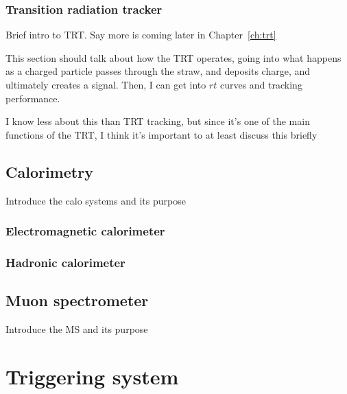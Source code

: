 \subsubsection{Transition radiation tracker} 

{\color{red} Brief intro to TRT. Say more is coming later in
  Chapter~\ref{ch:trt}}

{\color{red}This section should talk about how the TRT operates, going into
  what happens as a charged particle passes through the straw, and deposits
  charge, and ultimately creates a signal. Then, I can get into $rt$ curves
  and tracking performance.}

{\color{red}I know less about this than TRT tracking, but since it's one of the
  main functions of the TRT, I think it's important to at least discuss this
    briefly}

\subsection{Calorimetry} 

{\color{red} Introduce the calo systems and its purpose}

\subsubsection{Electromagnetic calorimeter} 

\subsubsection{Hadronic calorimeter} 

\subsection{Muon spectrometer} 

{\color{red} Introduce the MS and its purpose}

\section{Triggering system}

